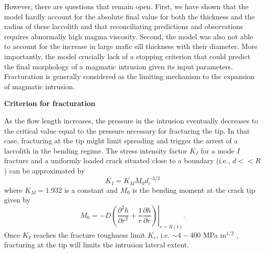 However, there  are questions that  remain open. First, we  have shown
that the  model hardly account for  the absolute final value  for both
the   thickness  and   the  radius   of  these   laccolith  and   that
reconciliating predictions  and observations requires  abnormally high
magma viscosity.  Second,  the model was also not able  to account for
the increase in  large mafic sill thickness with  their diameter. More
importantly, the  model crucially  lack of  a stopping  criterion that
could predict the  final morphology of a magmatic  intrusion given its
input parameters. Fracturation is generally considered as the limiting
mechanism to the expansion of magmatic intrusion.

\vspace{.5cm} \textbf{Criterion for fracturation} \vspace{.5cm}

As the flow length increases, the pressure in the intrusion eventually
decreases to  the critical value  equal to the pressure  necessary for
fracturing the  tip. In that case,  fracturing at the tip  might limit
spreading and trigger the arrest of a laccolith in the bending regime.
The  stress intensity  factor  $K_I$ for  a mode  $I$  fracture and  a
uniformly loaded crack situated close to a boundary (i.e., $d<<R$) can
be approximated by \citep{Dyskin:2000iz,Bunger:2005ee}
\begin{equation}
  K_I = K_M M_0 d_c^{-3/2}
  \label{KC}
\end{equation}
where $K_M = 1.932$  is a constant and $M_0$ is  the bending moment at
the crack tip given by
\begin{equation}
  M_0        =        -D       \left.\left(\frac{\partial^2        h}{\partial
        r^2}+\frac{1}{r}\frac{\partial                     h}{\partial
        r}\right)\right|_{r=R(t)}.
  \label{moment}
\end{equation}
Once  $K_I$   reaches  the   fracture  toughness  limit   $K_c$,  i.e.
$\sim 4-400$ MPa m$^{1/2}$ \citep{Olson:2003hc}, fracturing at the tip
will limits the intrusion lateral extent.

